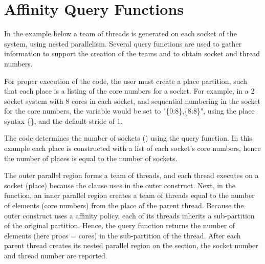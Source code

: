 \newpage
\section{Affinity Query Functions}
\label{sec: affinity_query}

In the example below a team of threads is generated on each socket of
the system, using nested parallelism. Several query functions are used
to gather information to support the creation of the teams and to obtain 
socket and thread numbers.

For proper execution of the code, the user must create a place partition, such that
each place is a listing of the core numbers for a socket. For example,
in a 2 socket system with 8 cores in each socket, and sequential numbering
in the socket for the core numbers, the  variable would be set
to "\{0:8\},\{8:8\}", using the place syntax \{\},
and the default stride of 1.

The code determines the number of sockets ()
using the  query function.
In this example each place is constructed with a list of 
each socket's core numbers, hence the number of places is equal
to the number of sockets. 

The outer parallel region forms a team of threads, and each thread 
executes on a socket (place) because the  clause uses 
 in the outer  construct.
Next, in the  function, an inner parallel region creates a team 
of threads equal to the number of elements (core numbers) from the place
of the parent thread. Because the outer  construct uses 
a  affinity policy, each of its threads inherits a sub-partition of 
the original partition.  Hence, the  query function
returns the number of elements (here procs = cores) in the sub-partition of the thread.  
After each parent thread creates its nested parallel region on the section,
the socket number and thread number are reported.

